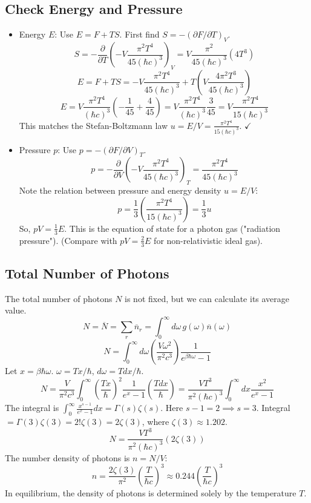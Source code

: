 \documentclass[11pt]{article}
\newcommand{\avg}[1]{\overline{#1}}
\newcommand{\pderiv}[2]{\frac{\partial #1}{\partial #2}}
\newcommand{\nbar}{\overline{n}} %
\begin{document}
\subsection*{Check Energy and Pressure}
\begin{itemize}
    \item Energy $E$: Use $E = F+TS$. First find $S = -(\partial F/\partial T)_V$.
    \[ S = -\pderiv{}{T} \left( - V \frac{\pi^2 T^4}{45 (\hbar c)^3} \right)_V = V \frac{\pi^2}{45 (\hbar c)^3} (4T^3) \]
    \[ E = F + TS = - V \frac{\pi^2 T^4}{45 (\hbar c)^3} + T \left( V \frac{4\pi^2 T^3}{45 (\hbar c)^3} \right) \]
    \[ E = V \frac{\pi^2 T^4}{(\hbar c)^3} \left( -\frac{1}{45} + \frac{4}{45} \right) = V \frac{\pi^2 T^4}{(\hbar c)^3} \frac{3}{45} = V \frac{\pi^2 T^4}{15 (\hbar c)^3} \]
    This matches the Stefan-Boltzmann law $u = E/V = \frac{\pi^2 T^4}{15 (\hbar c)^3}$. $\checkmark$
    \item Pressure $p$: Use $p = -(\partial F/\partial V)_T$.
    \[ p = -\pderiv{}{V} \left( - V \frac{\pi^2 T^4}{45 (\hbar c)^3} \right)_T = \frac{\pi^2 T^4}{45 (\hbar c)^3} \]
    Note the relation between pressure and energy density $u=E/V$:
    \[ p = \frac{1}{3} \left( \frac{\pi^2 T^4}{15 (\hbar c)^3} \right) = \frac{1}{3} u \]
    So, $pV = \frac{1}{3} E$. This is the equation of state for a photon gas ("radiation pressure").
    (Compare with $pV = \frac{2}{3} E$ for non-relativistic ideal gas).
\end{itemize}

\subsection*{Total Number of Photons}
The total number of photons $N$ is not fixed, but we can calculate its average value.
\[ N = \avg{N} = \sum_r \nbar_r = \int_0^\infty d\omega \, g(\omega) \nbar(\omega) \]
\[ N = \int_0^\infty d\omega \left( \frac{V \omega^2}{\pi^2 c^3} \right) \frac{1}{e^{\beta\hbar\omega} - 1} \]
Let $x=\beta\hbar\omega$. $\omega = Tx/\hbar$, $d\omega=Tdx/\hbar$.
\[ N = \frac{V}{\pi^2 c^3} \int_0^\infty \left(\frac{Tx}{\hbar}\right)^2 \frac{1}{e^x - 1} \left(\frac{Tdx}{\hbar}\right) = \frac{V T^3}{\pi^2 (\hbar c)^3} \int_0^\infty dx \frac{x^2}{e^x - 1} \]
The integral is $\int_0^\infty \frac{x^{s-1}}{e^x-1} dx = \Gamma(s)\zeta(s)$. Here $s-1=2 \implies s=3$.
Integral $= \Gamma(3)\zeta(3) = 2! \zeta(3) = 2 \zeta(3)$, where $\zeta(3) \approx 1.202$.
\[ N = \frac{V T^3}{\pi^2 (\hbar c)^3} (2\zeta(3)) \]
The number density of photons is $n = N/V$:
\[ n = \frac{2 \zeta(3)}{\pi^2} \left( \frac{T}{\hbar c} \right)^3 \approx 0.244 \left( \frac{T}{\hbar c} \right)^3 \]
In equilibrium, the density of photons is determined solely by the temperature $T$.
\end{document}

